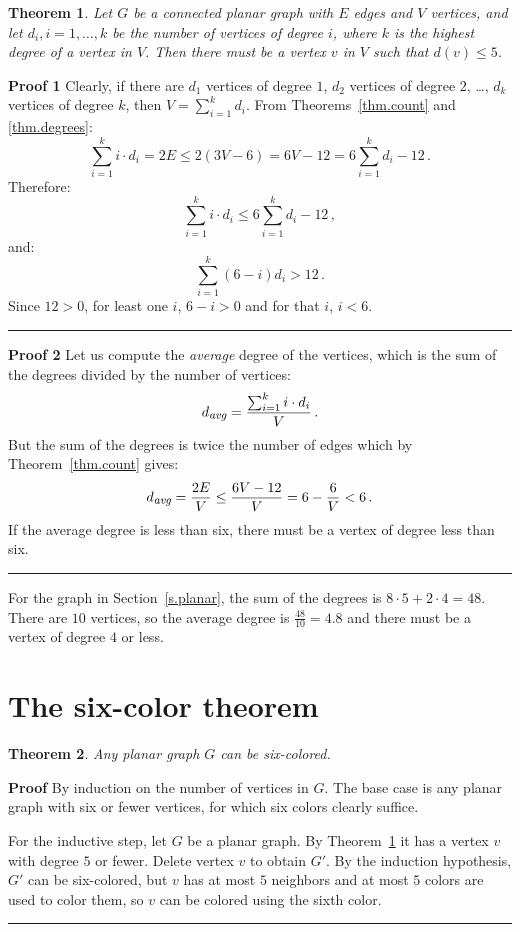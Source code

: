 \documentclass[11pt,a4paper]{article}
\newtheorem{theorem}{Theorem}
\newcommand*{\qed}{\hfill\rule{1ex}{1.5ex}}
\begin{document}
\begin{theorem}\label{thm.degree5}
Let $G$ be a connected planar graph with $E$ edges and $V$ vertices, and let $d_i,i=1,\ldots,k$ be the number of vertices of degree $i$, where $k$ is the highest degree of a vertex in $V$. Then there must be a vertex $v$ in $V$ such that $d(v) \leq 5$.
\end{theorem}
\textbf{Proof 1}
Clearly, if there are $d_1$ vertices of degree $1$, $d_2$ vertices of degree $2$, \ldots, $d_k$ vertices of degree $k$, then $V=\sum_{i=1}^{k}d_i$.  From Theorems~\ref{thm.count} and \ref{thm.degrees}:
\[
\sum_{i=1}^{k} i\cdot d_i=2E\leq 2(3V-6) = 6V-12=6\sum_{i=1}^{k} d_i -12\,.
\]
Therefore:
\[
\sum_{i=1}^{k} i\cdot d_i \leq 6\sum_{i=1}^{k} d_i -12\,,
\]
and:
\[
\sum_{i=1}^{k} (6-i)d_i> 12\,.
\]
Since $12>0$, for least one $i$, $6-i>0$ and for that $i$, $i<6$. \qed

\textbf{Proof 2} Let us compute the \emph{average} degree of the vertices, which is the sum of the degrees divided by the number of vertices:
\[
d_{\textit{\footnotesize avg}}=\frac{\sum_{i=1}^{k} i\cdot d_i}{V}\,.
\]
But the sum of the degrees is twice the number of edges which by Theorem~\ref{thm.count} gives:
\[
d_{\textit{\footnotesize avg}}=\frac{2E}{V}\leq \frac{6V-12}{V}=6-\frac{6}{V}<6\,.
\]
If the average degree is less than six, there must be a vertex of degree less than six.\qed


For the graph in Section~\ref{s.planar}, the sum of the degrees is $8\cdot 5 + 2\cdot 4=48$. There are $10$ vertices, so the average degree is $\frac{48}{10}=4.8$ and there must be a vertex of degree $4$ or less.

\section{The six-color theorem}

\begin{theorem}\label{thm.sixcolor}
Any planar graph $G$ can be six-colored.
\end{theorem}
\textbf{Proof} By induction on the number of vertices in $G$. The base case is any planar graph with six or fewer vertices, for which six colors clearly suffice.

For the inductive step, let $G$ be a planar graph. By Theorem~\ref{thm.degree5} it has a vertex $v$ with degree $5$ or fewer. Delete vertex $v$ to obtain $G'$. By the induction hypothesis, $G'$ can be six-colored, but $v$ has at most $5$ neighbors and at most $5$ colors are used to color them, so $v$ can be colored using the sixth color. \qed
\end{document}
